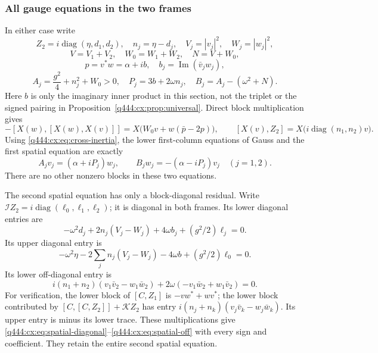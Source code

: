 \subsubsection*{All gauge equations in the two frames}
In either case write
\[
 Z_2=i\operatorname{diag}(\eta,d_1,d_2),\quad
 n_j=\eta-d_j,\quad V_j=|v_j|^2,\quad W_j=|w_j|^2,
\]
\[
 V=V_1+V_2,\quad W_0=W_1+W_2,\quad N=V+W_0,
\]
\[
 p=v^*w=\alpha+i b,\quad b_j=\operatorname{Im}(\bar v_jw_j),
\]
\[
 A_j=\frac{g^2}{4}+n_j^2+W_0>0,\quad
 P_j=3b+2\omega n_j,\quad B_j=A_j-(\omega^2+N).
\]
Here $b$ is only the imaginary inner product in this section, not the
triplet or the signed pairing in Proposition~\ref{q444:cx:prop:universal}.
Direct block multiplication gives
\begin{equation}\label{q444:cx:eq:block-double}
 -[X(w),[X(w),X(v)]]
       =X\bigl(W_0v+w(\bar p-2p)\bigr),\qquad
 [X(v),Z_2]=X\bigl(i\operatorname{diag}(n_1,n_2)v\bigr).
\end{equation}
Using \eqref{q444:cx:eq:cross-inertia}, the lower first-column equations of
Gauss and the first spatial equation are exactly
\begin{equation}\label{q444:cx:eq:cross-gauge}
 A_jv_j=(\alpha+iP_j)w_j,\qquad
 B_jw_j=-(\alpha-iP_j)v_j\quad(j=1,2).
\end{equation}
There are no other nonzero blocks in these two equations.

The second spatial equation has only a block-diagonal residual.
Write $\mathcal IZ_2=i\operatorname{diag}(\ell_0,\ell_1,\ell_2)$;
it is diagonal in both frames. Its lower diagonal entries are
\begin{equation}\label{q444:cx:eq:spatial-diagonal}
 -\omega^2d_j+2n_j(V_j-W_j)+4\omega b_j+(g^2/2)\ell_j=0.
\end{equation}
Its upper diagonal entry is
\begin{equation}\label{q444:cx:eq:spatial-top}
 -\omega^2\eta-2\sum_jn_j(V_j-W_j)-4\omega b
                                    +(g^2/2)\ell_0=0.
\end{equation}
Its lower off-diagonal entry is
\begin{equation}\label{q444:cx:eq:spatial-off}
 i(n_1+n_2)(v_1\bar v_2-w_1\bar w_2)
                    +2\omega(-v_1\bar w_2+w_1\bar v_2)=0.
\end{equation}
For verification, the lower block of $[C,Z_1]$ is $-vw^*+wv^*$;
the lower block contributed by $[C,[C,Z_2]]+\mathcal KZ_2$ has
entry $i(n_j+n_k)(v_j\bar v_k-w_j\bar w_k)$.
Its upper entry is minus its lower trace. These multiplications give
\eqref{q444:cx:eq:spatial-diagonal}--\eqref{q444:cx:eq:spatial-off} with every sign and
coefficient. They retain the entire second spatial equation.


